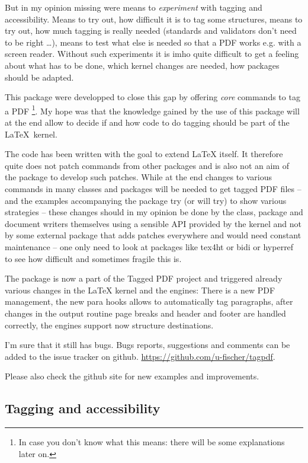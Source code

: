 \documentclass[DIV=12,parskip=half-,bibliography=totoc,a4paper]{article}
\newcommand\PDF{PDF}
\begin{document}
But in my opinion missing were means to \emph{experiment} with tagging and accessibility. Means to try out, how difficult it is to tag some structures, means to try out, how much tagging is really needed (standards and validators don't need to be right \ldots), means to test what else is needed so that a \PDF{} works e.g. with a screen reader. Without such experiments it is imho quite difficult to get a feeling about what has to be done, which kernel changes are needed, how packages should be adapted.


This package were developped to close this gap by offering \emph{core} commands to tag a \PDF{}%
\footnote{In case you don't know what this means: there will be some explanations later on.}.
My hope was that the knowledge gained by the use of this package will at the end allow to decide if and how code to do tagging should be part of the \LaTeX\ kernel.


The code has been written with the goal to extend \LaTeX{} itself.
It therefore quite does not patch commands from other packages and is also not an aim of the package to develop such patches. While at the end changes to various commands in many classes and packages will be needed to get tagged \PDF{} files -- and the examples accompanying the package try (or will try) to show various strategies -- these changes should in my opinion be done by the class, package and document writers themselves using a sensible API provided by the kernel and not by some external package that adds patches everywhere and would need constant maintenance -- one only need to look at packages like tex4ht or bidi or hyperref to see how difficult and sometimes fragile this is.


The package is now a part of the Tagged PDF project and triggered already various changes in the LaTeX kernel and the engines: There is a new PDF management,
the new para hooks allows to automatically tag paragraphs, after changes in the output routine
page breaks and header and footer are handled correctly, the engines support
now structure destinations.

I'm sure that it still has bugs. Bugs reports, suggestions and comments can be added to the issue tracker on github. \url{https://github.com/u-fischer/tagpdf}.

Please also check the github site for new examples and improvements.

\subsection{Tagging and accessibility}
\end{document}
